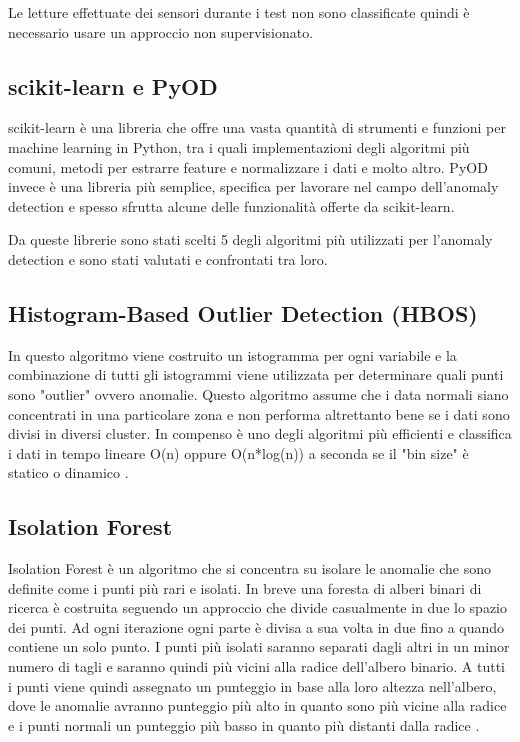 Le letture effettuate dei sensori durante i test non sono classificate quindi è necessario usare un approccio non supervisionato. 

\subsection{scikit-learn e PyOD}
scikit-learn\cite{scikit-learn} è una libreria che offre una vasta quantità di strumenti e funzioni per machine learning in Python, tra i quali implementazioni degli algoritmi più comuni, metodi per estrarre feature e normalizzare i dati e molto altro.
PyOD\cite{zhao2019pyod} invece è una libreria più semplice, specifica per lavorare nel campo dell'anomaly detection e spesso sfrutta alcune delle funzionalità offerte da scikit-learn.

Da queste librerie sono stati scelti 5 degli algoritmi più utilizzati per l'anomaly detection e sono stati valutati e confrontati tra loro.

\subsection{Histogram-Based Outlier Detection (HBOS)}
In questo algoritmo viene costruito un istogramma per ogni variabile e la combinazione di tutti gli istogrammi viene utilizzata per determinare quali punti sono "outlier" ovvero anomalie. Questo algoritmo assume che i data normali siano concentrati in una particolare zona e non performa altrettanto bene se i dati sono divisi in diversi cluster. In compenso è uno degli algoritmi più efficienti e classifica i dati in tempo lineare O(n) oppure O(n*log(n)) a seconda se il "bin size" è statico o dinamico \cite{HBOS}.

\subsection{Isolation Forest}
Isolation Forest è un algoritmo che si concentra su isolare le anomalie che sono definite come i punti più rari e isolati. In breve una foresta di alberi binari di ricerca è costruita seguendo un approccio che divide casualmente in due lo spazio dei punti. Ad ogni iterazione ogni parte è divisa a sua volta in due fino a quando contiene un solo punto. I punti più isolati saranno separati dagli altri in un minor numero di tagli e saranno quindi più vicini alla radice dell'albero binario. A tutti i punti viene quindi assegnato un punteggio in base alla loro altezza nell'albero, dove le anomalie avranno punteggio più alto in quanto sono più vicine alla radice e i punti normali un punteggio più basso in quanto più distanti dalla radice \cite{IF}.


